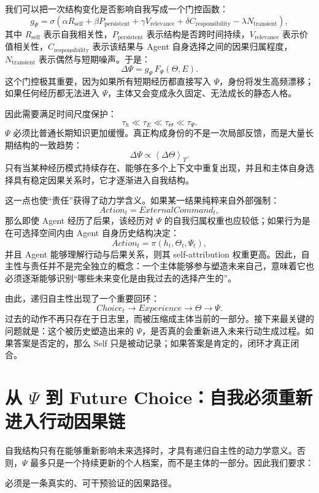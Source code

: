 我们可以把一次结构变化是否影响自我写成一个门控函数：
\[
g_{\Psi}
=
\sigma
\left(
\alpha R_{\mathrm{self}}
+
\beta P_{\mathrm{persistent}}
+
\gamma V_{\mathrm{relevance}}
+
\delta C_{\mathrm{responsibility}}
-
\lambda N_{\mathrm{transient}}
\right),
\]
其中 $R_{\mathrm{self}}$ 表示自我相关性，$P_{\mathrm{persistent}}$ 表示结构是否跨时间持续，$V_{\mathrm{relevance}}$ 表示价值相关性，$C_{\mathrm{responsibility}}$ 表示该结果与 Agent 自身选择之间的因果归属程度，$N_{\mathrm{transient}}$ 表示偶然与短期噪声。于是：
\[
\Delta\Psi
=
g_\Psi\,
F_\Psi(\Theta,E).
\]
这个门控极其重要，因为如果所有短期经历都直接写入 $\Psi$，身份将发生高频漂移；如果任何经历都无法进入 $\Psi$，主体又会变成永久固定、无法成长的静态人格。

因此需要满足时间尺度保护：
\[
\tau_h
\ll
\tau_E
\ll
\tau_\Theta
\ll
\tau_\Psi.
\]
$\Psi$ 必须比普通长期知识更加缓慢。真正构成身份的不是一次局部反馈，而是大量长期结构的一致趋势：
\[
\Delta\Psi
\propto
\left\langle
\Delta\Theta
\right\rangle_T.
\]
只有当某种经历模式持续存在、能够在多个上下文中重复出现，并且和主体自身选择具有稳定因果关系时，它才逐渐进入自我结构。

这一点也使“责任”获得了动力学含义。如果某一结果纯粹来自外部强制：
\[
Action_t
=
ExternalCommand_t,
\]
那么即使 Agent 经历了后果，该经历对 $\Psi$ 的自我归属权重也应较低；如果行为是在可选择空间内由 Agent 自身历史结构决定：
\[
Action_t
=
\pi(h_t,\Theta_t,\Psi_t),
\]
并且 Agent 能够理解行动与后果关系，则其 self-attribution 权重更高。因此，自主性与责任并不是完全独立的概念：一个主体能够参与塑造未来自己，意味着它也必须逐渐能够识别“哪些未来变化是由我过去的选择产生的”。

由此，递归自主性出现了一个重要回环：
\[
Choice_t
\rightarrow
Experience
\rightarrow
\Theta
\rightarrow
\Psi.
\]
过去的动作不再只存在于日志里，而被压缩成主体当前的一部分。接下来最关键的问题就是：这个被历史塑造出来的 $\Psi$，是否真的会重新进入未来行动生成过程。如果答案是否定的，那么 Self 只是被动记录；如果答案是肯定的，闭环才真正闭合。

\section{从 \texorpdfstring{$\Psi$}{Psi} 到 Future Choice：自我必须重新进入行动因果链}

自我结构只有在能够重新影响未来选择时，才具有递归自主性的动力学意义。否则，$\Psi$ 最多只是一个持续更新的个人档案，而不是主体的一部分。因此我们要求：
\begin{statementbox}
\centering
{}
\end{statementbox}
必须是一条真实的、可干预验证的因果路径。

